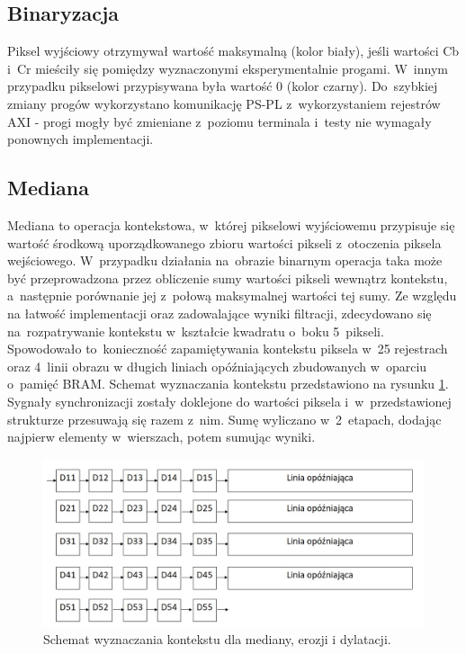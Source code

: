 

\subsection{Binaryzacja}
\label{subsec:Binaryzacja}
Piksel wyjściowy otrzymywał wartość maksymalną (kolor biały), jeśli wartości Cb i~Cr mieściły się pomiędzy wyznaczonymi eksperymentalnie progami.  
W~innym przypadku pikselowi przypisywana była wartość 0 (kolor czarny). 
Do~szybkiej zmiany progów wykorzystano komunikację PS-PL z~wykorzystaniem rejestrów AXI - progi mogły być zmieniane z~poziomu terminala i~testy nie wymagały ponownych implementacji.  



\subsection{Mediana}
\label{subsec:Mediana}

Mediana to operacja kontekstowa, w~której pikselowi wyjściowemu przypisuje się wartość środkową uporządkowanego zbioru wartości pikseli z~otoczenia piksela wejściowego. 
W~przypadku działania na~obrazie binarnym operacja taka może być przeprowadzona przez obliczenie sumy wartości pikseli wewnątrz kontekstu, a~następnie porównanie jej z~połową maksymalnej wartości tej sumy. 
Ze względu na łatwość implementacji oraz zadowalające wyniki filtracji, zdecydowano się na~rozpatrywanie kontekstu w~kształcie kwadratu o~boku 5~pikseli. 
Spowodowało to~konieczność zapamiętywania kontekstu piksela w~25 rejestrach oraz 4~linii obrazu w długich liniach opóźniających zbudowanych w~oparciu o~pamięć BRAM.
Schemat wyznaczania kontekstu przedstawiono na rysunku \ref{fig:kontekst}. 
Sygnały synchronizacji zostały doklejone do wartości piksela i~w~przedstawionej strukturze przesuwają się razem z~nim. 
Sumę wyliczano w~2~etapach, dodając najpierw elementy w~wierszach, potem sumując wyniki. 
\begin{figure}[h]
	\centering
	\includegraphics[width=\textwidth]{kontekst.jpg}
	\caption{Schemat wyznaczania kontekstu dla mediany, erozji i dylatacji.}
	\label{fig:kontekst}
\end{figure}  


